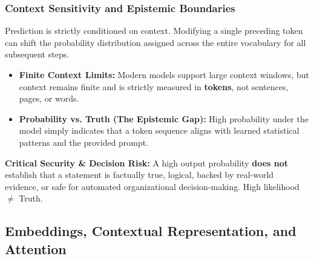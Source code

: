 \subsubsection{Context Sensitivity and Epistemic Boundaries}

Prediction is strictly conditioned on context. Modifying a single preceding token can shift the probability distribution assigned across the entire vocabulary for all subsequent steps.

\begin{itemize}
    \item \textbf{Finite Context Limits:} Modern models support large context windows, but context remains finite and is strictly measured in \textbf{tokens}, not sentences, pages, or words.
    \item \textbf{Probability vs. Truth (The Epistemic Gap):} High probability under the model simply indicates that a token sequence aligns with learned statistical patterns and the provided prompt. 
\end{itemize}

\begin{warningbox}
\textbf{Critical Security \& Decision Risk:} A high output probability \textbf{does not} establish that a statement is factually true, logical, backed by real-world evidence, or safe for automated organizational decision-making. High likelihood $\neq$ Truth.
\end{warningbox}

\clearpage
\subsection{Embeddings, Contextual Representation, and Attention}










